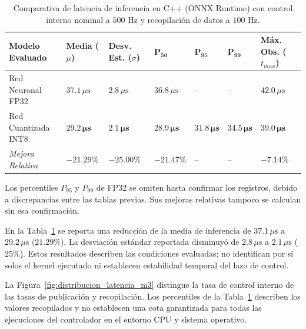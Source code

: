 \documentclass[12pt]{article}
\begin{document}
\begin{table}[htbp]
\centering
\footnotesize
\setlength{\tabcolsep}{3.5pt}
\caption{Comparativa de latencia de inferencia en C++ (ONNX Runtime) con control interno nominal a $500\text{ Hz}$ y recopilación de datos a $100\text{ Hz}$.}
\label{tab:latencia_inferencia_comp}
\begin{tabularx}{\textwidth}{>{\raggedright\arraybackslash}X >{\centering\arraybackslash}p{1.7cm} >{\centering\arraybackslash}p{1.8cm} >{\centering\arraybackslash}p{1.5cm} >{\centering\arraybackslash}p{1.5cm} >{\centering\arraybackslash}p{1.5cm} >{\centering\arraybackslash}p{1.8cm}}
\toprule
\textbf{Modelo Evaluado} & \textbf{Media} ($\mu$) & \textbf{Desv. Est.} ($\sigma$) & $\bm{P_{50}}$ & $\bm{P_{95}}$ & $\bm{P_{99}}$ & \textbf{Máx. Obs.} ($t_{max}$) \\
\midrule
Red Neuronal FP32 & $37.1\,\mu\text{s}$ & $2.8\,\mu\text{s}$ & $36.8\,\mu\text{s}$ & -- & -- & $42.0\,\mu\text{s}$ \\
Red Cuantizada INT8 & $\mathbf{29.2\,\mu\text{s}}$ & $\mathbf{2.1\,\mu\text{s}}$ & $\mathbf{28.9\,\mu\text{s}}$ & $\mathbf{31.8\,\mu\text{s}}$ & $\mathbf{34.5\,\mu\text{s}}$ & $\mathbf{39.0\,\mu\text{s}}$ \\
\midrule
\textit{Mejora Relativa} & \textbf{$-21.29\%$} & \textbf{$-25.00\%$} & \textbf{$-21.47\%$} & -- & -- & \textbf{$-7.14\%$} \\
\bottomrule
\end{tabularx}
\end{table}

Los percentiles $P_{95}$ y $P_{99}$ de FP32 se omiten hasta confirmar los registros, debido a discrepancias entre las tablas previas. Sus mejoras relativas tampoco se calculan sin esa confirmación.

En la Tabla~\ref{tab:latencia_inferencia_comp} se reporta una reducción de la media de inferencia de $37.1\,\mu\text{s}$ a $29.2\,\mu\text{s}$ ($21.29\%$). La desviación estándar reportada disminuyó de $2.8\,\mu\text{s}$ a $2.1\,\mu\text{s}$ ($25\%$). Estos resultados describen las condiciones evaluadas; no identifican por sí solos el kernel ejecutado ni establecen estabilidad temporal del lazo de control.

La Figura~\ref{fig:distribucion_latencia_m3} distingue la tasa de control interno de las tasas de publicación y recopilación. Los percentiles de la Tabla~\ref{tab:latencia_inferencia_comp} describen los valores recopilados y no establecen una cota garantizada para todas las ejecuciones del controlador en el entorno CPU y sistema operativo.
\end{document}
